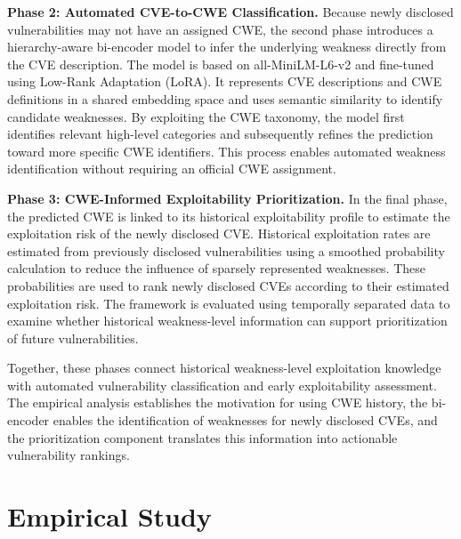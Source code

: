 \documentclass[conference,compsoc]{IEEEtran}
\begin{document}
\textbf{Phase 2: Automated CVE-to-CWE Classification.}
Because newly disclosed vulnerabilities may not have
an assigned CWE, the second phase introduces a
hierarchy-aware bi-encoder model to infer the underlying
weakness directly from the CVE description.
The model is based on all-MiniLM-L6-v2 and fine-tuned
using Low-Rank Adaptation (LoRA). It represents CVE
descriptions and CWE definitions in a shared embedding
space and uses semantic similarity to identify
candidate weaknesses. By exploiting the CWE taxonomy,
the model first identifies relevant high-level
categories and subsequently refines the prediction
toward more specific CWE identifiers. This process
enables automated weakness identification without
requiring an official CWE assignment.

\textbf{Phase 3: CWE-Informed Exploitability
Prioritization.}
In the final phase, the predicted CWE is linked to
its historical exploitability profile to estimate
the exploitation risk of the newly disclosed CVE.
Historical exploitation rates are estimated from
previously disclosed vulnerabilities using a
smoothed probability calculation to reduce the
influence of sparsely represented weaknesses.
These probabilities are used to rank newly disclosed
CVEs according to their estimated exploitation risk.
The framework is evaluated using temporally separated
data to examine whether historical weakness-level
information can support prioritization of future
vulnerabilities.

Together, these phases connect historical
weakness-level exploitation knowledge with automated
vulnerability classification and early exploitability
assessment. The empirical analysis establishes the
motivation for using CWE history, the bi-encoder
enables the identification of weaknesses for newly
disclosed CVEs, and the prioritization component
translates this information into actionable
vulnerability rankings.

\section{Empirical Study}
\label{sec:empirical_study}
\end{document}

